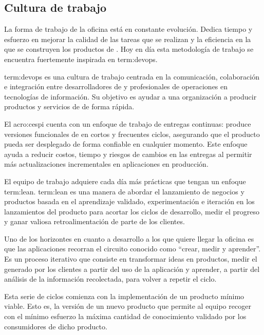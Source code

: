 \subsection{Cultura de trabajo}
\label{cultura_de_trabajo}

La forma de trabajo de la oficina está en constante evolución. Dedica tiempo y
esfuerzo en mejorar la calidad de las tareas que se realizan y la eficiencia en
la que se construyen los productos de . Hoy en día esta
metodología de trabajo se encuentra fuertemente inspirada en \gls{term:devops}.

\gls{term:devops} es una cultura de trabajo centrada en la comunicación,
colaboración e integración entre desarrolladores de  y
profesionales de operaciones en tecnologías de información. Su objetivo es
ayudar a una organización a producir productos y servicios de  de
forma rápida.

El \gls{acro:cespi} cuenta con un enfoque de trabajo de entregas continuas:
produce versiones funcionales de  en cortos y frecuentes ciclos,
asegurando que el producto pueda ser desplegado de forma confiable en cualquier
momento. Este enfoque ayuda a reducir costos, tiempo y riesgos de cambios en
las entregas al permitir más actualizaciones incrementales en aplicaciones en
producción.

El equipo de trabajo adquiere cada día más prácticas que tengan un enfoque
\gls{term:lean}. \gls{term:lean} es una manera de abordar el lanzamiento de
negocios y productos basada en el aprendizaje validado, experimentación e
iteración en los lanzamientos del producto para acortar los ciclos de
desarrollo, medir el progreso y ganar valiosa retroalimentación de parte de los
clientes.

Uno de los horizontes en cuanto a desarrollo a los que quiere llegar la oficina
es que las aplicaciones recorran el circuito  conocido como
“crear, medir y aprender”. Es un proceso iterativo que consiste en transformar
ideas en productos, medir el  generado por los clientes a partir
del uso de la aplicación y aprender, a partir del análisis de la información
recolectada, para volver a repetir el ciclo.

Esta serie de ciclos comienza con la implementación de un producto mínimo
viable. Esto es, la versión de un nuevo producto que permite al equipo recoger
con el mínimo esfuerzo la máxima cantidad de conocimiento validado por los
consumidores de dicho producto.


